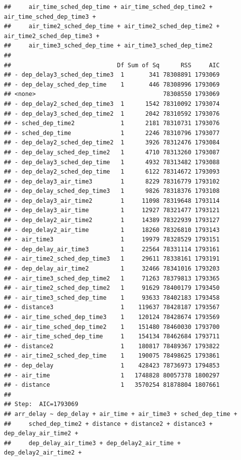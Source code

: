 \documentclass[
]{article}
\begin{document}
\begin{verbatim}
##     air_time_sched_dep_time + air_time_sched_dep_time2 + air_time_sched_dep_time3 + 
##     air_time2_sched_dep_time + air_time2_sched_dep_time2 + air_time2_sched_dep_time3 + 
##     air_time3_sched_dep_time + air_time3_sched_dep_time2
## 
##                              Df Sum of Sq      RSS     AIC
## - dep_delay3_sched_dep_time3  1       341 78308891 1793069
## - dep_delay_sched_dep_time    1       446 78308996 1793069
## <none>                                    78308550 1793069
## - dep_delay2_sched_dep_time3  1      1542 78310092 1793074
## - dep_delay3_sched_dep_time2  1      2042 78310592 1793076
## - sched_dep_time2             1      2181 78310731 1793076
## - sched_dep_time              1      2246 78310796 1793077
## - dep_delay2_sched_dep_time2  1      3926 78312476 1793084
## - dep_delay_sched_dep_time2   1      4710 78313260 1793087
## - dep_delay3_sched_dep_time   1      4932 78313482 1793088
## - dep_delay2_sched_dep_time   1      6122 78314672 1793093
## - dep_delay3_air_time3        1      8229 78316779 1793102
## - dep_delay_sched_dep_time3   1      9826 78318376 1793108
## - dep_delay3_air_time2        1     11098 78319648 1793114
## - dep_delay3_air_time         1     12927 78321477 1793121
## - dep_delay2_air_time2        1     14389 78322939 1793127
## - dep_delay2_air_time         1     18260 78326810 1793143
## - air_time3                   1     19979 78328529 1793151
## - dep_delay_air_time3         1     22564 78331114 1793161
## - air_time2_sched_dep_time3   1     29611 78338161 1793191
## - dep_delay_air_time2         1     32466 78341016 1793203
## - air_time3_sched_dep_time2   1     71263 78379813 1793365
## - air_time2_sched_dep_time2   1     91629 78400179 1793450
## - air_time3_sched_dep_time    1     93633 78402183 1793458
## - distance3                   1    119637 78428187 1793567
## - air_time_sched_dep_time3    1    120124 78428674 1793569
## - air_time_sched_dep_time2    1    151480 78460030 1793700
## - air_time_sched_dep_time     1    154134 78462684 1793711
## - distance2                   1    180817 78489367 1793822
## - air_time2_sched_dep_time    1    190075 78498625 1793861
## - dep_delay                   1    428423 78736973 1794853
## - air_time                    1   1748828 80057378 1800297
## - distance                    1   3570254 81878804 1807661
## 
## Step:  AIC=1793069
## arr_delay ~ dep_delay + air_time + air_time3 + sched_dep_time + 
##     sched_dep_time2 + distance + distance2 + distance3 + dep_delay_air_time2 + 
##     dep_delay_air_time3 + dep_delay2_air_time + dep_delay2_air_time2 + 

\end{verbatim}
\end{document}
